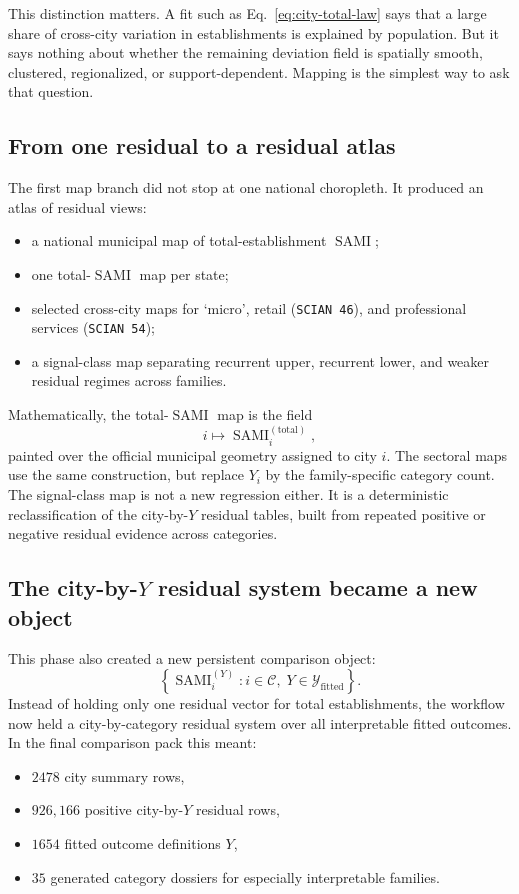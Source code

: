 \documentclass[11pt]{article}
\newcommand{\SAMI}{\operatorname{SAMI}}
\begin{document}
This distinction matters. A fit such as Eq.~\eqref{eq:city-total-law} says that a large share of cross-city variation in establishments is explained by population. But it says nothing about whether the remaining deviation field is spatially smooth, clustered, regionalized, or support-dependent. Mapping is the simplest way to ask that question.

\subsection{From one residual to a residual atlas}

The first map branch did not stop at one national choropleth. It produced an atlas of residual views:
\begin{itemize}
\item a national municipal map of total-establishment \(\SAMI\);
\item one total-\(\SAMI\) map per state;
\item selected cross-city maps for `micro', retail (\texttt{SCIAN 46}), and professional services (\texttt{SCIAN 54});
\item a signal-class map separating recurrent upper, recurrent lower, and weaker residual regimes across families.
\end{itemize}

Mathematically, the total-\(\SAMI\) map is the field
\begin{equation}
i \mapsto \SAMI_i^{(\text{total})},
\end{equation}
painted over the official municipal geometry assigned to city \(i\). The sectoral maps use the same construction, but replace \(Y_i\) by the family-specific category count. The signal-class map is not a new regression either. It is a deterministic reclassification of the city-by-\(Y\) residual tables, built from repeated positive or negative residual evidence across categories.

\subsection{The city-by-\(Y\) residual system became a new object}

This phase also created a new persistent comparison object:
\begin{equation}
\left\{
\SAMI_i^{(Y)}
:
i \in \mathcal{C},
\;
Y \in \mathcal{Y}_{\mathrm{fitted}}
\right\}.
\end{equation}
Instead of holding only one residual vector for total establishments, the workflow now held a city-by-category residual system over all interpretable fitted outcomes. In the final comparison pack this meant:
\begin{itemize}
\item \(2478\) city summary rows,
\item \(926{,}166\) positive city-by-\(Y\) residual rows,
\item \(1654\) fitted outcome definitions \(Y\),
\item \(35\) generated category dossiers for especially interpretable families.
\end{itemize}
\end{document}
